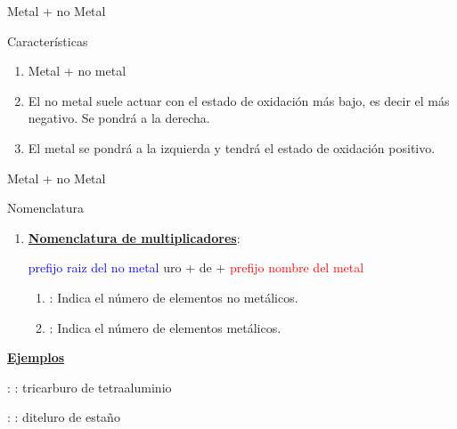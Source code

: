 \documentclass{beamer}
\begin{document}
\begin{frame}[c]{Metal + no Metal}
    \begin{block}{\Large Características}
        \begin{enumerate}[label=\itembolascolor{\arabic*}{mDarkTeal}]
            \item Metal + no metal
            \item El no metal suele actuar con el estado de oxidación más bajo, es decir el más negativo. Se pondrá a la derecha.
            \item El metal se pondrá a la izquierda y tendrá el estado de oxidación positivo.
        \end{enumerate}
    \end{block}
\end{frame}

\begin{frame}[t]{Metal + no Metal}
    \begin{alertblock}{\Large Nomenclatura}\vspace*{5pt}

        \begin{enumerate}[label=\itembolascolor{\arabic*}{mDarkTeal}]
            \item \textbf{\uline{Nomenclatura de multiplicadores}}:
                  \begin{center}
                      \textcolor{blue}{prefijo} \textcolor{blue}{raiz del no metal} \textcolor{mygreen}{uro} + de + \textcolor{red}{prefijo} \textcolor{red}{nombre del metal}
                  \end{center}
                  \begin{enumerate}[label=\textcolor{red}{$\bullet$}]
                      \item {}: Indica el número de elementos no metálicos.
                      \item {}: Indica el número de elementos metálicos.
                  \end{enumerate}
        \end{enumerate}
        \textbf{\uline{Ejemplos}}

         : : tricarburo de tetraaluminio

         : : diteluro de estaño
    \end{alertblock}
\end{frame}
\end{document}
